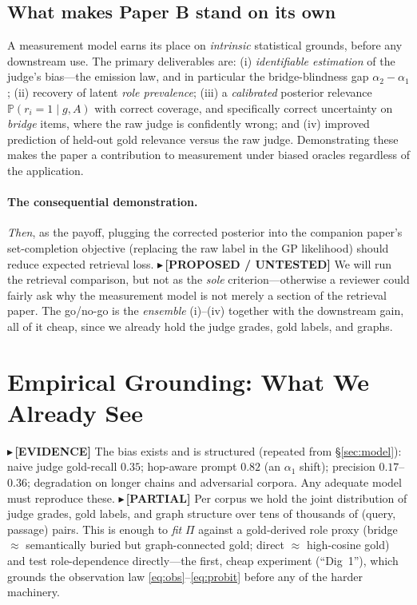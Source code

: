 \documentclass[11pt]{article}
\newcommand{\TESTED}[1]{{\color{teal}\small$\blacktriangleright$\,\textbf{[EVIDENCE]} #1}}
\newcommand{\PARTIAL}[1]{{\color{orange}\small$\blacktriangleright$\,\textbf{[PARTIAL]} #1}}
\newcommand{\PROP}[1]{{\color{violet}\small$\blacktriangleright$\,\textbf{[PROPOSED / UNTESTED]} #1}}
\renewcommand{\Pr}{\mathbb{P}}
\begin{document}
\subsection{What makes Paper B stand on its own}
A measurement model earns its place on \emph{intrinsic} statistical grounds, before any downstream use. The
primary deliverables are: (i) \emph{identifiable estimation} of the judge's bias---the emission law, and in
particular the bridge-blindness gap $\alpha_2-\alpha_1$; (ii) recovery of latent \emph{role prevalence}; (iii) a
\emph{calibrated} posterior relevance $\Pr(r_i{=}1\mid g,A)$ with correct coverage, and specifically correct
uncertainty on \emph{bridge} items, where the raw judge is confidently wrong; and (iv) improved prediction of
held-out gold relevance versus the raw judge. Demonstrating these makes the paper a contribution to measurement
under biased oracles regardless of the application.
\paragraph{The consequential demonstration.} \emph{Then}, as the payoff, plugging the corrected posterior into
the companion paper's set-completion objective (replacing the raw label in the GP likelihood) should reduce
expected retrieval loss.
\PROP{We will run the retrieval comparison, but not as the \emph{sole} criterion---otherwise a reviewer could
fairly ask why the measurement model is not merely a section of the retrieval paper. The go/no-go is the
\emph{ensemble} (i)--(iv) together with the downstream gain, all of it cheap, since we already hold the judge
grades, gold labels, and graphs.}

\section{Empirical Grounding: What We Already See}\label{sec:evid}
\TESTED{The bias exists and is structured (repeated from \S\ref{sec:model}): naive judge gold-recall $0.35$;
hop-aware prompt $0.82$ (an $\alpha_1$ shift); precision $0.17$--$0.36$; degradation on longer chains and
adversarial corpora. Any adequate model must reproduce these.}
\PARTIAL{Per corpus we hold the joint distribution of judge grades, gold labels, and graph structure over tens
of thousands of (query, passage) pairs. This is enough to \emph{fit} $\Pi$ against a gold-derived role proxy
(bridge $\approx$ semantically buried but graph-connected gold; direct $\approx$ high-cosine gold) and test
role-dependence directly---the first, cheap experiment (``Dig~1''), which grounds the observation law
\eqref{eq:obs}--\eqref{eq:probit} before any of the harder machinery.}
\end{document}
